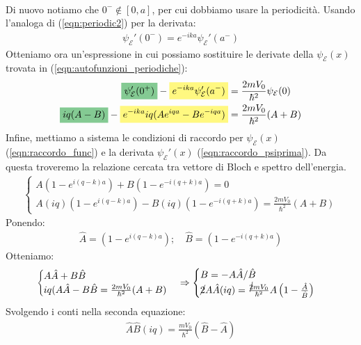 \documentclass[../../FisicaTeorica.tex]{subfiles}
\begin{document}
\begin{enumerate}
\begin{align*}
\end{align*}
Di nuovo notiamo che $0^- \notin [0,a]$, per cui dobbiamo usare la periodicità. Usando l'analoga di (\ref{eqn:periodic2}) per la derivata:
\begin{align*}
\psi_\mathcal{E}'(0^-) = e^{-ika} \psi_\mathcal{E}'(a^-)
\end{align*}
Otteniamo ora un'espressione in cui possiamo sostituire le derivate della $\psi_\mathcal{E}(x)$ trovata in (\ref{eqn:autofunzioni_periodiche}):
\begin{align}\nonumber
\hlc{ForestGreen}{\psi'_\mathcal{E}(0^+)}-\hlc{Yellow}{e^{-ika}\psi'_\mathcal{E}(a^-)}&=\frac{2mV_0}{\hbar^2}\psi_\mathcal{E}(0)\\
\hlc{ForestGreen}{iq(A-B)} -\hlc{Yellow}{e^{-ika}iq(Ae^{iqa}-Be^{-iqa})} &= \frac{2mV_0}{\hbar^2}(A+B)
\label{eqn:raccordo_psiprima}
\end{align}
Infine, mettiamo a sistema le condizioni di raccordo per $\psi_\mathcal{E}(x)$ (\ref{eqn:raccordo_func}) e la derivata $\psi_\mathcal{E}'(x)$ (\ref{eqn:raccordo_psiprima}). Da questa troveremo la relazione cercata tra vettore di Bloch e spettro dell'energia.\\
\begin{align*}
\begin{cases}
A(1-e^{i(q-k)a}) +B(1-e^{-i(q+k)a})=0\\
A(iq)(1-e^{i(q-k)a})-B(iq)(1-e^{-i(q+k)a}) = \frac{2mV_0}{\hbar^2}(A+B)
\end{cases}
\end{align*}
Ponendo:
\begin{align*}
\hat{A}=(1-e^{i(q-k)a}); \quad \hat{B} = (1-e^{-i(q+k)a})
\end{align*}
Otteniamo:
\begin{align*}
\begin{cases}
A \hat{A} + B\hat{B}\\
iq(A\hat{A}-B\hat{B} = \frac{2mV_0}{\hbar^2}(A+B)
\end{cases}\Rightarrow 
\begin{cases}
B=-A\hat{A}/\hat{B}\\
\cancel{2}A\hat{A}(iq) = \frac{\cancel{2}mV_0}{\hbar^2}A\left(1-\frac{\hat{A}}{\hat{B}}\right)
\end{cases}
\end{align*}
Svolgendo i conti nella seconda equazione:
\begin{align*}
\hat{A}\hat{B}(iq) = \frac{mV_0}{\hbar^2}(\hat{B}-\hat{A})\\

\end{align*}
\end{enumerate}
\end{document}
